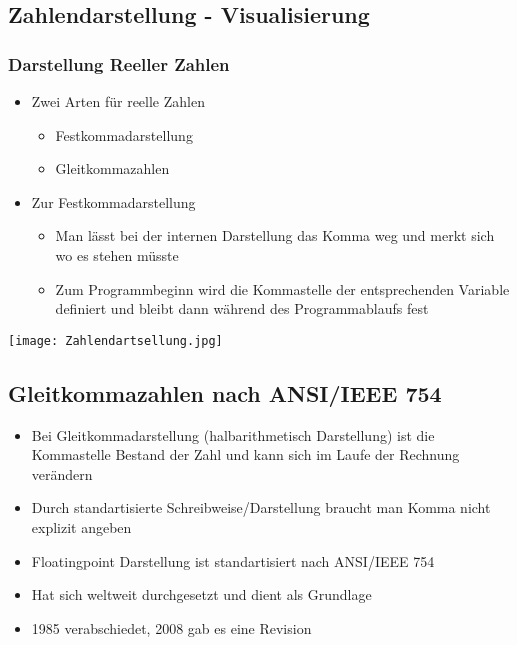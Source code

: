 	\subsection{Zahlendarstellung - Visualisierung}
		\begin{minipage}{0.55\textwidth}
			\subsubsection{Darstellung Reeller Zahlen}
			\begin{itemize}
				\item Zwei Arten für reelle Zahlen
						\begin{itemize}
							\item Festkommadarstellung
							\item Gleitkommazahlen
						\end{itemize}
				\item Zur Festkommadarstellung
						\begin{itemize}
							\item Man lässt bei der internen Darstellung das Komma weg und
								merkt sich wo es stehen müsste
							\item Zum Programmbeginn wird die Kommastelle der entsprechenden Variable definiert
								und bleibt dann während des Programmablaufs fest
						\end{itemize}
			\end{itemize}
		\end{minipage}
		\begin{minipage}{0.4\textwidth}
			\begin{center}
				\texttt{[image: Zahlendartsellung.jpg]}
			\end{center}
		\end{minipage}


	\subsection{Gleitkommazahlen nach ANSI/IEEE 754}
			\begin{itemize}
				\item Bei Gleitkommadarstellung (halbarithmetisch Darstellung) ist die Kommastelle 
					Bestand der Zahl und kann sich im Laufe der Rechnung verändern
				\item Durch standartisierte Schreibweise/Darstellung braucht man Komma nicht 
					explizit angeben
				\item Floatingpoint Darstellung ist standartisiert nach ANSI/IEEE 754
				\item Hat sich weltweit durchgesetzt und dient als Grundlage
				\item 1985 verabschiedet, 2008 gab es eine Revision 
			\end{itemize}

